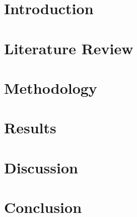 \documentclass[a4paper,12pt]{report}
\begin{document}
\titlepagecontent

\tableofcontents

\chapter{Introduction}

\chapter{Literature Review}

\chapter{Methodology}

\chapter{Results}

\chapter{Discussion}

\chapter{Conclusion}



\end{document}

